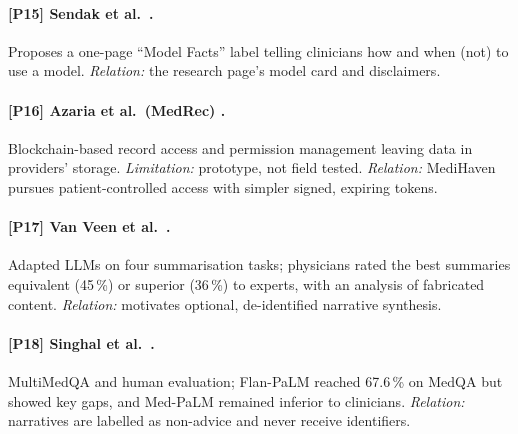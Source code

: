 \paragraph{[P15] Sendak et al.\ \cite{sendak2020modelfacts}.} Proposes a one-page ``Model Facts'' label
telling clinicians how and when (not) to use a model. \emph{Relation:} the research page's model card and
disclaimers.

\paragraph{[P16] Azaria et al.\ (MedRec) \cite{azaria2016medrec}.} Blockchain-based record access and
permission management leaving data in providers' storage. \emph{Limitation:} prototype, not field
tested. \emph{Relation:} MediHaven pursues patient-controlled access with simpler signed, expiring tokens.

\paragraph{[P17] Van Veen et al.\ \cite{vanveen2024adapted}.} Adapted LLMs on four summarisation tasks;
physicians rated the best summaries equivalent (45\,\%) or superior (36\,\%) to experts, with an analysis
of fabricated content. \emph{Relation:} motivates optional, de-identified narrative synthesis.

\paragraph{[P18] Singhal et al.\ \cite{singhal2023llmclinical}.} MultiMedQA and human evaluation; Flan-PaLM
reached 67.6\,\% on MedQA but showed key gaps, and Med-PaLM remained inferior to clinicians.
\emph{Relation:} narratives are labelled as non-advice and never receive identifiers.


